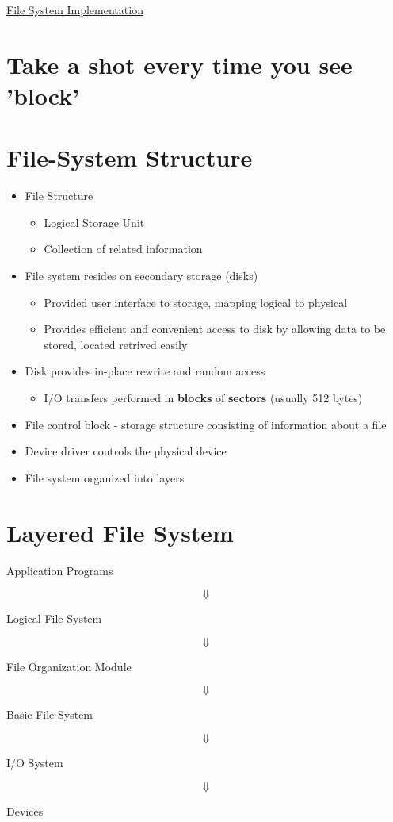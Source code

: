 \documentclass{article}[18pt]
\begin{document}
\begin{center}
\underline{\huge File System Implementation}
\end{center}
\section*{Take a shot every time you see 'block'}
\section{File-System Structure}
\begin{itemize}
	\item File Structure
	\begin{itemize}
		\item Logical Storage Unit
		\item Collection of related information
	\end{itemize}
	\item File system resides on secondary storage (disks)
	\begin{itemize}
		\item Provided user interface to storage, mapping logical to physical
		\item Provides efficient and convenient access to disk by allowing data to be stored, located retrived easily
	\end{itemize}
	\item Disk provides in-place rewrite and random access
	\begin{itemize}
		\item I/O transfers performed in \textbf{blocks} of \textbf{sectors} (usually 512 bytes)
	\end{itemize}
	\item File control block - storage structure consisting of information about a file
	\item Device driver controls the physical device
	\item File system organized into layers
\end{itemize}
\section{Layered File System}
\begin{center}
	Application Programs
\end{center}
$$\Downarrow$$
\begin{center}
	Logical File System
\end{center}
$$\Downarrow$$
\begin{center}
	File Organization Module
\end{center}
$$\Downarrow$$
\begin{center}
	Basic File System
\end{center}
$$\Downarrow$$
\begin{center}
	I/O System
\end{center}
$$\Downarrow$$
\begin{center}
	Devices
\end{center}
\end{document}
